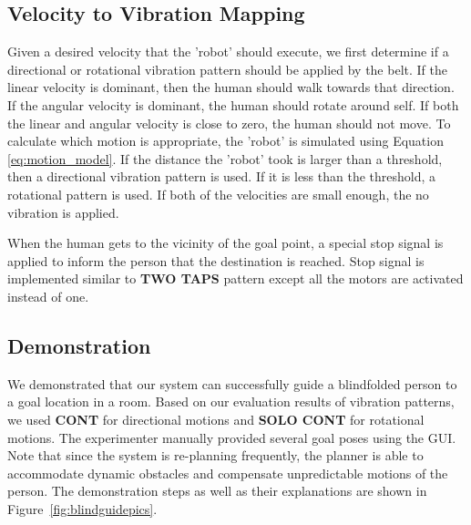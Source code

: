 \subsection{Velocity to Vibration Mapping}


Given a desired velocity that the 'robot' should execute, we first determine if a directional or rotational vibration pattern should be applied by the belt. If the linear velocity is dominant, then the human should walk towards that direction. If the angular velocity is dominant, the human should rotate around self. If both the linear and angular velocity is close to zero, the human should not move. To calculate which motion is appropriate, the 'robot' is simulated using Equation \ref{eq:motion_model}. If the distance the 'robot' took is larger than a threshold, then a directional vibration pattern is used. If it is less than the threshold, a rotational pattern is used. If both of the velocities are small enough, the no vibration is applied. 

When the human gets to the vicinity of the goal point, a special stop signal is applied to inform the person that the destination is reached. Stop signal is implemented similar to \textbf{TWO TAPS} pattern except all the motors are activated instead of one.

\subsection{Demonstration}

We demonstrated that our system can successfully guide a blindfolded person to a goal location in a room. Based on our evaluation results of vibration patterns, we used \textbf{CONT} for directional motions and \textbf{SOLO CONT} for rotational motions. The experimenter manually provided several goal poses using the GUI. Note that since the system is re-planning frequently, the planner is able to accommodate dynamic obstacles and compensate unpredictable motions of the person. The demonstration steps as well as their explanations are shown in Figure~\ref{fig:blindguidepics}.

